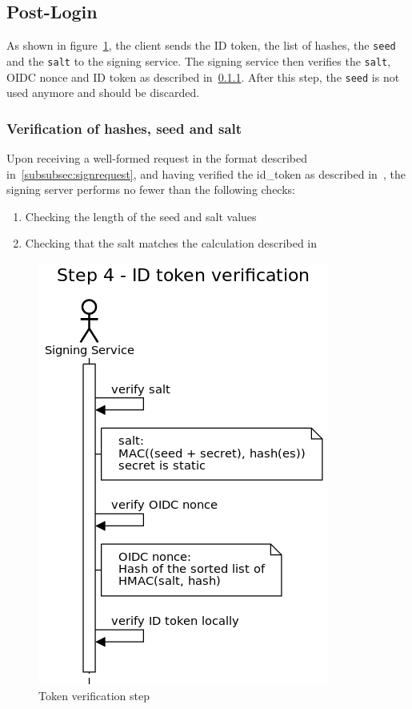 \subsection{Post-Login}\label{subsec:post-login}
As shown in figure~\ref{fig:tokenverificationstep},
the client sends the ID token, the list of hashes, the \texttt{seed} and the \texttt{salt} to the signing service.
The signing service then verifies the \texttt{salt}, OIDC nonce and ID token as described in~\ref{subsubsec:verificationhashesseedsalt}.
After this step, the \texttt{seed} is not used anymore and should be discarded.


\subsubsection{Verification of hashes, seed and salt}\label{subsubsec:verificationhashesseedsalt}
Upon receiving a well-formed request in the format described in~\ref{subsubsec:signrequest},
and having verified the id\_token as described in~\cite[Section~7.2]{rfc7519},
the signing server performs no fewer than the following checks:
\begin{enumerate}
	\item Checking the length of the seed and salt values
	\item Checking that the salt matches the calculation described in~
\end{enumerate}









\begin{figure}
	\begin{center}
		\includegraphics[scale=0.5]{images/protocol_step4_id_token_verification.png}
		\caption{Token verification step}
		\label{fig:tokenverificationstep}
	\end{center}
\end{figure}

